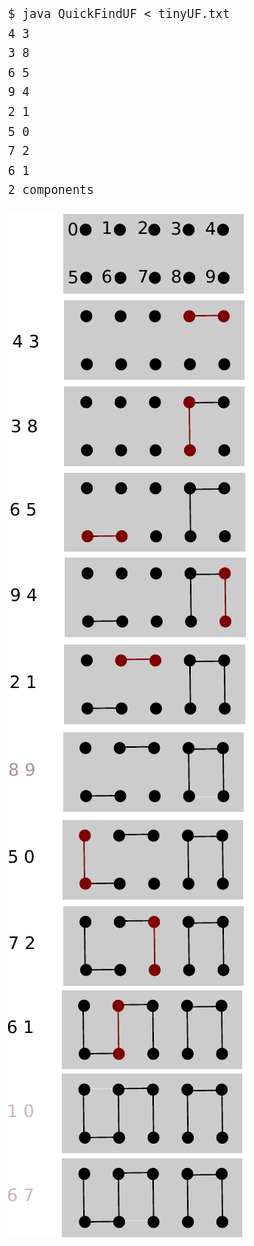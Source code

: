 \documentclass[8pt,a4paper,compress]{beamer}
\begin{document}
\begin{frame}[fragile]
\begin{minipage}{250pt}
\begin{itemize}
\begin{lstlisting}[language={}]
$ java QuickFindUF < tinyUF.txt 
4 3
3 8
6 5
9 4
2 1
5 0
7 2
6 1
2 components
\end{lstlisting}
\end{itemize}
\end{minipage}%
\begin{minipage}{60pt}
\hfill \includegraphics[scale=0.35]{./figures/dyn_conn.pdf}
\end{minipage}
\end{frame}
\end{document}
